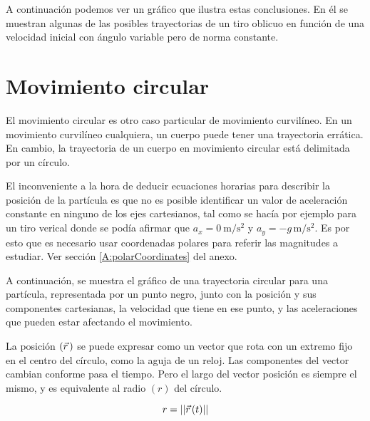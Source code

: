 A continuación podemos ver un gráfico que ilustra estas conclusiones.
En él se muestran algunas de las posibles trayectorias de un tiro oblicuo en función de una velocidad inicial con ángulo variable pero de norma constante.

\begin{center}
    \def\svgwidth{\linewidth}
    
\end{center}


\section{Movimiento circular}
\label{sec:circularMotion}

El movimiento circular es otro caso particular de movimiento curvilíneo.
En un movimiento curvilíneo cualquiera, un cuerpo puede tener una trayectoria errática.
En cambio, la trayectoria de un cuerpo en movimiento circular está delimitada por un círculo.

El inconveniente a la hora de deducir ecuaciones horarias para describir la posición de la partícula es que no es posible identificar un valor de aceleración constante en ninguno de los ejes cartesianos, tal como se hacía por ejemplo para un tiro verical donde se podía afirmar que $a_x=\SI{0}{\metre\per\second^2}$ y $a_y=-g\,\si{\metre\per\second^2}$.
Es por esto que es necesario usar {coordenadas polares} para referir las magnitudes a estudiar.
Ver sección \ref{A:polarCoordinates} del anexo.

A continuación, se muestra el gráfico de una trayectoria circular para una partícula, representada por un punto negro, junto con la posición y sus componentes cartesianas, la velocidad que tiene en ese punto, y las aceleraciones que pueden estar afectando el movimiento.

\begin{center}
    \def\svgwidth{\linewidth}
    
\end{center}

La posición $(\vec{r}\hspace{0.05cm})$ se puede expresar como un vector que rota con un extremo fijo en el centro del círculo, como la aguja de un reloj.
Las componentes del vector cambian conforme pasa el tiempo.
Pero el largo del vector posición es siempre el mismo, y es equivalente al radio $(r)$ del círculo.

\begin{mdframed}[style=PropertyFrame]
    \begin{prop}
        \label{prop:circularMovRadius}
    \end{prop}
    \begin{equation*}
        r = {\left|\left| {\vec{r}\hspace{0.05cm}(t)} \right|\right|}
    \end{equation*}
\end{mdframed}

